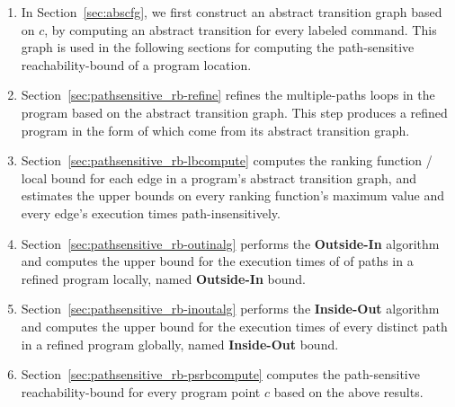 \begin{enumerate}
\item  In Section~\ref{sec:abscfg}, we first construct an abstract transition graph based on $c$, by computing an abstract transition 
for every labeled command. 
This graph is used in the following sections
for computing the path-sensitive reachability-bound of a program location.
\item Section~\ref{sec:pathsensitive_rb-refine}
refines the multiple-paths loops in the program
based on the abstract transition graph. This step produces a refined program in the form of  which come from its abstract transition graph.
\item Section~\ref{sec:pathsensitive_rb-lbcompute} computes the ranking function / local bound for each edge in a program's abstract transition graph,
and estimates the upper bounds on every ranking function's maximum value and every edge's execution times path-insensitively.
\item Section~\ref{sec:pathsensitive_rb-outinalg} performs the \textbf{Outside-In} algorithm and computes
the upper bound for the execution times of  of paths in a refined program locally, named \textbf{Outside-In} bound.
\item Section~\ref{sec:pathsensitive_rb-inoutalg} performs the \textbf{Inside-Out} algorithm and 
computes the upper bound for the execution times of
every distinct path in a refined program globally, named \textbf{Inside-Out} bound.
\item Section~\ref{sec:pathsensitive_rb-psrbcompute} computes the path-sensitive reachability-bound for every program point
 $c$ based on the above results.
\end{enumerate}

